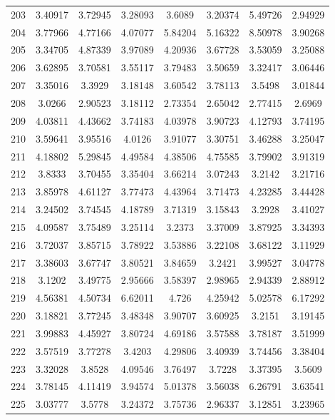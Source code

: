 \begin{center}
\begin{longtable}{cccccccc}
203 & 3.40917 & 3.72945 & 3.28093 & 3.6089 & 3.20374 & 5.49726 & 2.94929\\
204 & 3.77966 & 4.77166 & 4.07077 & 5.84204 & 5.16322 & 8.50978 & 3.90268\\
205 & 3.34705 & 4.87339 & 3.97089 & 4.20936 & 3.67728 & 3.53059 & 3.25088\\
206 & 3.62895 & 3.70581 & 3.55117 & 3.79483 & 3.50659 & 3.32417 & 3.06446\\
207 & 3.35016 & 3.3929 & 3.18148 & 3.60542 & 3.78113 & 3.5498 & 3.01844\\
208 & 3.0266 & 2.90523 & 3.18112 & 2.73354 & 2.65042 & 2.77415 & 2.6969\\
209 & 4.03811 & 4.43662 & 3.74183 & 4.03978 & 3.90723 & 4.12793 & 3.74195\\
210 & 3.59641 & 3.95516 & 4.0126 & 3.91077 & 3.30751 & 3.46288 & 3.25047\\
211 & 4.18802 & 5.29845 & 4.49584 & 4.38506 & 4.75585 & 3.79902 & 3.91319\\
212 & 3.8333 & 3.70455 & 3.35404 & 3.66214 & 3.07243 & 3.2142 & 3.21716\\
213 & 3.85978 & 4.61127 & 3.77473 & 4.43964 & 3.71473 & 4.23285 & 3.44428\\
214 & 3.24502 & 3.74545 & 4.18789 & 3.71319 & 3.15843 & 3.2928 & 3.41027\\
215 & 4.09587 & 3.75489 & 3.25114 & 3.2373 & 3.37009 & 3.87925 & 3.34393\\
216 & 3.72037 & 3.85715 & 3.78922 & 3.53886 & 3.22108 & 3.68122 & 3.11929\\
217 & 3.38603 & 3.67747 & 3.80521 & 3.84659 & 3.2421 & 3.99527 & 3.04778\\
218 & 3.1202 & 3.49775 & 2.95666 & 3.58397 & 2.98965 & 2.94339 & 2.88912\\
219 & 4.56381 & 4.50734 & 6.62011 & 4.726 & 4.25942 & 5.02578 & 6.17292\\
220 & 3.18821 & 3.77245 & 3.48348 & 3.90707 & 3.60925 & 3.2151 & 3.19145\\
221 & 3.99883 & 4.45927 & 3.80724 & 4.69186 & 3.57588 & 3.78187 & 3.51999\\
222 & 3.57519 & 3.77278 & 3.4203 & 4.29806 & 3.40939 & 3.74456 & 3.38404\\
223 & 3.32028 & 3.8528 & 4.09546 & 3.76497 & 3.7228 & 3.37395 & 3.5609\\
224 & 3.78145 & 4.11419 & 3.94574 & 5.01378 & 3.56038 & 6.26791 & 3.63541\\
225 & 3.03777 & 3.5778 & 3.24372 & 3.75736 & 2.96337 & 3.12851 & 3.23965\\

\end{longtable}
\end{center}
